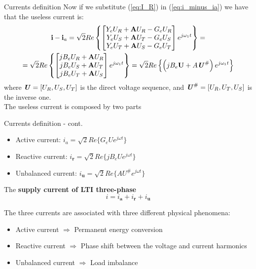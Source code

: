 \documentclass[aspectratio=169]{beamer}
\begin{document}
\begin{frame}{Currents definition}{\insertsection}
    Now if we substitute (\ref{eq:I_R}) in (\ref{eq:i_minus_ia}) we have that the useless current is:
    \begin{gather}
        \textbf{i} - \textbf{i}_a = \sqrt{2} Re\left\{
        \begin{bmatrix}
        Y_e U_R + \textbf{A} U_R - G_e U_R \\
        Y_e U_S + \textbf{A} U_T - G_e U_S \\
        Y_e U_T + \textbf{A} U_S - G_e U_T
        \end{bmatrix}
e^{j\omega_1t}\right\} = \notag \\
= \sqrt{2} Re\left\{
        \begin{bmatrix}
        j B_e U_R + \textbf{A} U_R \\
        j B_e U_S + \textbf{A} U_T \\
        j B_e U_T + \textbf{A} U_S 
        \end{bmatrix}
e^{j\omega_1t}\right\} = \sqrt{2} Re\left\{\left(jB_e\textbf{U} + A\textbf{\textit{U}}^{\#}\right)e^{j\omega_1t}\right\} 
    \end{gather}
     where $\textbf{\textit{U}} = \left[U_R, U_S, U_T\right]$ is the direct voltage sequence, and $\textbf{\textit{U}}^{\#} = \left[U_R, U_T, U_S\right]$ is the inverse one.\\
     \textcolor{NTNU_orange}{The useless current is composed by two parts}
\end{frame}

\begin{frame}{Currents definition - cont.}{\insertsection}
    \begin{itemize}
      \item Active current: $\pmb{\mathit{i}}_{a} = \sqrt{2}Re\{G_e\pmb{\mathit{U}}e^{j\omega t}\}$
      \item Reactive current: $\pmb{\mathit{i}_{r}} = \sqrt{2}Re\{jB_e\pmb{\mathit{U}}e^{j\omega t}\}$
      \item Unbalanced current: $\pmb{\mathit{i}_{u}} = \sqrt{2}Re\{A\pmb{\mathit{U}}^{\#}e^{j\omega t}\}$
    \end{itemize}

    The \textbf{supply current of LTI three-phase}
    \begin{equation}
      \pmb{\mathit{i}} = \pmb{\mathit{i}_{a}} + \pmb{\mathit{i}_{r}} + \pmb{\mathit{i}_{u}}
    \end{equation}

    The three currents are associated with three different physical phenomena:
    \begin{itemize}
      \item Active current $\Rightarrow$ Permanent energy conversion
      \item Reactive current $\Rightarrow$ Phase shift between the voltage and current harmonics
      \item Unbalanced current $\Rightarrow$ Load imbalance
    \end{itemize}
  \end{frame}
\end{document}
